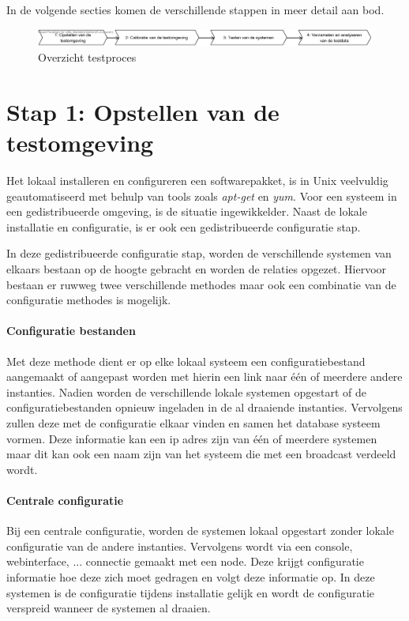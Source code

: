 In de volgende secties komen de verschillende stappen in meer detail aan bod.  
\begin{figure}[ht!]
\centering
\includegraphics[width=\linewidth]{img/Test-Process-Overview}
\caption{Overzicht testproces}
\label{fig:test-process-overview}
\end{figure}

\section{Stap 1: Opstellen van de testomgeving}
Het lokaal installeren en configureren een softwarepakket, is in Unix veelvuldig geautomatiseerd met behulp van tools zoals \textit{apt-get} en \textit{yum}. Voor een systeem in een gedistribueerde omgeving, is de situatie ingewikkelder. Naast de lokale installatie en configuratie, is er ook een gedistribueerde configuratie stap.  

In deze gedistribueerde configuratie stap, worden de verschillende systemen van elkaars bestaan op de hoogte gebracht en worden de relaties opgezet. Hiervoor bestaan er ruwweg twee verschillende methodes maar ook een combinatie van de configuratie methodes is mogelijk.
 
\paragraph{Configuratie bestanden} Met deze methode dient er op elke lokaal systeem een configuratiebestand aangemaakt of aangepast worden met hierin een link naar één of meerdere andere instanties. Nadien worden de verschillende lokale systemen opgestart of de configuratiebestanden opnieuw ingeladen in de al draaiende instanties. Vervolgens zullen deze met de configuratie elkaar vinden en samen het database systeem vormen. Deze informatie kan een ip adres zijn van één of meerdere systemen maar dit kan ook een naam zijn van het systeem die met een broadcast verdeeld wordt. 
\paragraph{Centrale configuratie} Bij een centrale configuratie, worden de systemen lokaal opgestart zonder lokale configuratie van de andere instanties. Vervolgens wordt via een console, webinterface, ... connectie gemaakt met een node. Deze krijgt configuratie informatie hoe deze zich moet gedragen en volgt deze informatie op. In deze systemen is de configuratie tijdens installatie gelijk en wordt de configuratie verspreid wanneer de systemen al draaien.  


